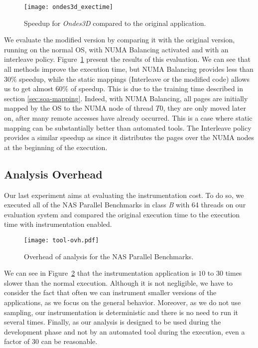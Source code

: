 \begin{figure}[!t]
    \centering
    \texttt{[image: ondes3d\_exectime]}
    \caption{Speedup for \emph{Ondes3D} compared to the original application.}
\label{fig:ondes-res}
\end{figure}

We evaluate the modified version by comparing it with the original
version, running on the normal OS, with NUMA Balancing activated and with an
interleave policy. Figure~\ref{fig:ondes-res} present the results of this
evaluation. We can see that all methods improve the execution time, but
NUMA Balancing provides less than $30\%$ speedup, while the static mappings
(Interleave or the modified code) allows us to get almost $60\%$ of speedup. This is
due to the training time described in section \ref{sec:soa-mapping}. Indeed,
with NUMA Balancing, all pages are initially mapped by the OS to the NUMA node of thread $T0$, they
are only moved later on, after many remote accesses have already occurred. This is a case where static mapping can be substantially better than automated
tools. The Interleave policy provides a similar speedup as
\TABARNAC since it distributes the pages over the NUMA nodes at the beginning of
the execution.

\subsection{Analysis Overhead}
\label{sec:expe-overhead}

Our last experiment aims at evaluating the instrumentation cost. To do so, we
executed all of the NAS Parallel Benchmarks in class \emph{B} with 64 threads on our evaluation system and compared
the original execution time to the execution time with instrumentation enabled.

\begin{figure}[!t]
    \centering
    \texttt{[image: tool-ovh.pdf]}
    \caption{Overhead of \TABARNAC analysis for the NAS Parallel Benchmarks.}
    \label{fig:ovh}
\end{figure}


We can see in Figure~\ref{fig:ovh} that
the instrumentation application is $10$ to $30$ times slower than the normal execution. Although it is
not negligible, we have to consider the fact that often we can instrument
smaller versions of the applications, as we focus on the general behavior.
Moreover, as we do not use sampling, our instrumentation is deterministic and
there is no need to run it several times. Finally, as our
analysis is designed to be used during the development phase and not by an automated tool during the execution, even a factor of $30$
can be reasonable.


